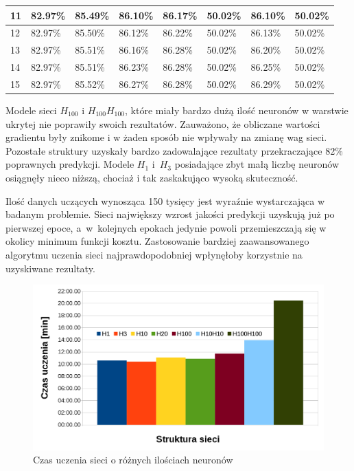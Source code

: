 \begin{table}[H]
\begin{tabular}{|l|l|l|l|l|l|l|l|}
11             & 82.97\%          & 85.49\%          & 86.10\%           & 86.17\%           & 50.02\%            & 86.10\%                 & 50.02\%                   \\ \hline
12             & 82.97\%          & 85.50\%          & 86.12\%           & 86.22\%           & 50.02\%            & 86.13\%                 & 50.02\%                   \\ \hline
13             & 82.97\%          & 85.51\%          & 86.16\%           & 86.28\%           & 50.02\%            & 86.20\%                 & 50.02\%                   \\ \hline
14             & 82.97\%          & 85.51\%          & 86.23\%           & 86.28\%           & 50.02\%            & 86.25\%                 & 50.02\%                   \\ \hline
15             & 82.97\%          & 85.52\%          & 86.27\%           & 86.28\%           & 50.02\%            & 86.29\%                 & 50.02\%                   \\ \hline
\end{tabular}
\end{table}

Modele sieci $H_{100}$ i $H_{100}H_{100}$, które miały bardzo dużą ilość neuronów w warstwie ukrytej nie poprawiły swoich rezultatów. Zauważono, że obliczane wartości gradientu były znikome i w żaden sposób nie wpływały na zmianę wag sieci. Pozostałe struktury uzyskały bardzo zadowalające rezultaty przekraczające 82\% poprawnych predykcji. Modele $H_1$ i~$H_3$ posiadające zbyt małą liczbę neuronów osiągnęły nieco niższą, chociaż i tak zaskakująco wysoką skuteczność.

Ilość danych uczących wynosząca 150 tysięcy jest wyraźnie wystarczająca w badanym problemie. Sieci największy wzrost jakości predykcji uzyskują już po pierwszej epoce, a~w~kolejnych epokach jedynie powoli przemieszczają się w okolicy minimum funkcji kosztu. Zastosowanie bardziej zaawansowanego algorytmu uczenia sieci najprawdopodobniej wpłynęłoby korzystnie na uzyskiwane rezultaty.

\begin{figure}
\includegraphics[width=\textwidth]{time_h.png}
\caption{Czas uczenia sieci o różnych ilościach neuronów}
\label{fig:timeh}
\end{figure}

